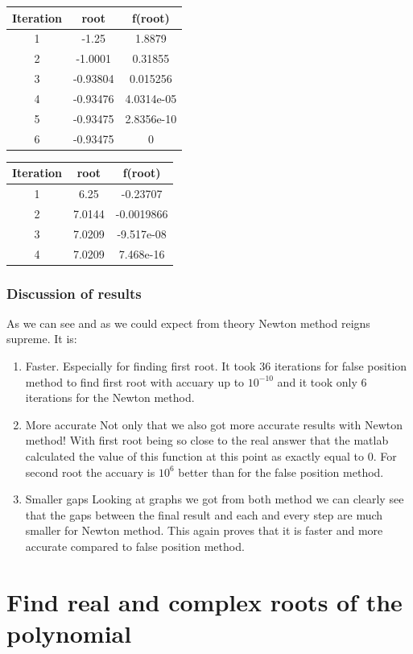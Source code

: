 \begin{center}
  \begin{tabular}{| c  c c |}
\hline
Iteration & root         & f(root) \\
\hline
1   &      -1.25   &      1.8879  \\
\hline
2   &    -1.0001   &     0.31855  \\
\hline
3   &   -0.93804   &    0.015256  \\
\hline
4   &   -0.93476   &  4.0314e-05  \\
\hline
5   & -0.93475    & 2.8356e-10  \\
\hline
6   &   -0.93475   &           0  \\
\hline
\hline

\hline
\end{tabular}
\end{center}

\begin{center}
  \begin{tabular}{| c  c c |}
\hline
Iteration & root         & f(root) \\
\hline
1   &     6.25    &   -0.23707  \\
\hline
2    &  7.0144    & -0.0019866 \\
\hline
3     & 7.0209    & -9.517e-08  \\
\hline
4      &7.0209    &  7.468e-16  \\
\hline
\hline

\hline
\end{tabular}
\end{center}

\subsection{Discussion of results}
As we can see and as we could expect from theory Newton method reigns supreme.
It is:
\begin{enumerate}
\item Faster.
Especially for finding first root. It took 36 iterations for false position method to find first root with accuary up to $10^{-10}$ and it took only 6 iterations for the Newton method.
\item More accurate
Not only that we also got more accurate results with Newton method! With first root being so close to the real answer that the matlab calculated the value of this function at this point as exactly equal to 0. For second root the accuary is $10^{6}$ better than for the false position method.
\item Smaller gaps
Looking at graphs we got from both method we can clearly see that the gaps between the final result and each and every step are much smaller for Newton method. This again proves that it is faster and more accurate compared to false position method.
\end{enumerate}



\chapter{Find real and complex roots of the polynomial}

